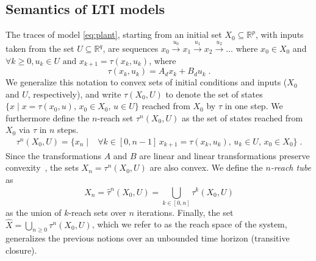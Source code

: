 \documentclass[a4paper,UKenglish]{lipics-v2018}
\newcommand{\mat}[1]{{#1}}
\renewcommand{\vec}[1]{{#1}}
\newcommand{\note}[1]{\textcolor{red}{[#1]}}
\begin{document}
\subsection{Semantics of LTI models}\label{sec:model_semantics}
%
The traces of model \eqref{eq:plant}, starting from an initial set
$X_0\subseteq \mathbb{R}^p$, with inputs taken from the set $U \subseteq
\mathbb{R}^q$, are sequences
%
$ \vec{x}_0 \xrightarrow{\vec{u}_0} \vec{x}_1 \xrightarrow{\vec{u}_1} \vec{x}_2 \xrightarrow{\vec{u}_2} \ldots $
%
where
%
$ \vec{x}_0 \in X_0$ and $\forall k\geq 0, \vec{u}_k \in U \text{ and } \vec{x}_{k+1} = \tau(\vec{x}_k,\vec{u}_k) $, 
where 
%
\begin{equation}\label{equ:reachtraj}
\tau(\vec{x}_k,\vec{u}_k) = %
\mat{A}_d\vec{x}_k + \mat{B}_d\vec{u}_k \;.
\end{equation}
%
%
We generalize this notation to convex sets of initial conditions and inputs
($X_0$ and $U$, respectively), and write $\tau(X_0,U)$ to denote the set of
states $\{\vec{x} \mid \vec{x} = \tau(\vec{x}_0,\vec{u}),\, \vec{x}_0 \in
X_0,\, \vec{u} \in U \}$ reached from $X_0$ by $\tau$ in one step.
%
We furthermore define the $n$-reach set $\tau^n(X_0,U)$ as the set of states
reached from $X_0$ via $\tau$ in $n$ steps.
%
\begin{align}\label{equ:reachset}
\tau^n(X_0,U) = \{\vec{x}_n \mid & 
\forall k\in [0,n-1] \, \vec{x}_{k+1}=\tau(\vec{x}_{k},\vec{u}_{k}), \,
\vec{u}_{k} \in U, \,   
\vec{x}_0 \in X_0
\} \;. 
\end{align}
%
Since the transformations $\mat{A}$ and $\mat{B}$ are linear and linear
transformations preserve convexity~\cite{boyd2004convex}, the sets $X_n =
\tau^n(X_0,U)$ are also convex.  We define the \emph{$n$-reach tube} as
%
\begin{equation}\label{equ:reachtube}
\hat{X}_n=\hat{\tau}^n(X_0,U)=\bigcup_{k\in[0,n]} \tau^k(X_0,U)
\end{equation}
%
as the union of $k$-reach sets over $n$ iterations. 
%
Finally, the set $\hat{X} =\bigcup_{n\geq 0} \tau^n(X_0,U)$, which we refer
to as the reach space of the system, generalizes the previous notions over
an unbounded time horizon (transitive closure).
\end{document}
